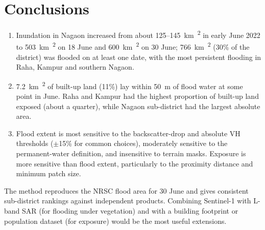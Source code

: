 \documentclass[11pt,a4paper]{article}
\newcommand{\kmsq}{km\textsuperscript{2}}
\begin{document}
\section{Conclusions}
\begin{enumerate}[label=(\roman*)]
\item Inundation in Nagaon increased from about \SI{125}{}--\SI{145}{\kmsq} in early June 2022 to \SI{503}{\kmsq} on
18 June and \SI{600}{\kmsq} on 30 June; \SI{766}{\kmsq} (30\% of the district) was flooded on at least one date, with the
most persistent flooding in Raha, Kampur and southern Nagaon.
\item \SI{7.2}{\kmsq} of built-up land (11\%) lay within \SI{50}{m} of flood water at some point in June. Raha and Kampur
had the highest proportion of built-up land exposed (about a quarter), while Nagaon sub-district had the largest
absolute area.
\item Flood extent is most sensitive to the backscatter-drop and absolute VH thresholds ($\pm$15\% for common choices),
moderately sensitive to the permanent-water definition, and insensitive to terrain masks. Exposure is more sensitive than
flood extent, particularly to the proximity distance and minimum patch size.
\end{enumerate}
The method reproduces the NRSC flood area for 30 June and gives consistent sub-district rankings against independent
products. Combining Sentinel-1 with L-band SAR (for flooding under vegetation) and with a building footprint or population
dataset (for exposure) would be the most useful extensions.
\end{document}
